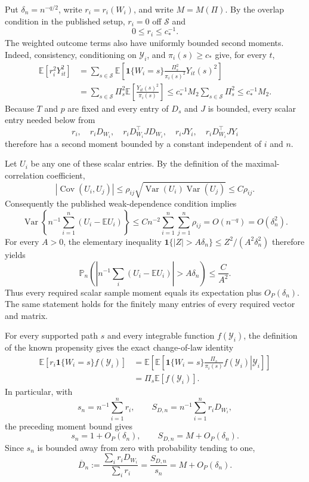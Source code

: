 Put \(\delta_n=n^{-q/2}\), write \(r_i=r_i(W_i)\), and write \(M=M(\Pi)\). By the overlap condition in the published setup, \(r_i=0\) off \(\mathcal S\) and
\[
0\leq r_i\leq c_*^{-1}.
\]
The weighted outcome terms also have uniformly bounded second moments. Indeed, consistency, conditioning on \(\mathscr Y_i\), and \(\pi_i(s)\geq c_*\) give, for every \(t\),
\[
\begin{aligned}
\mathbb E\!\left[r_i^2Y_{it}^2\right]
&=\sum_{s\in\mathcal S}\mathbb E\!\left[
  \mathbf 1\{W_i=s\}\frac{\Pi_s^2}{\pi_i(s)^2}Y_{it}(s)^2
\right]\\
&=\sum_{s\in\mathcal S}\Pi_s^2
  \mathbb E\!\left[\frac{Y_{it}(s)^2}{\pi_i(s)}\right]
\leq c_*^{-1}M_2\sum_{s\in\mathcal S}\Pi_s^2
\leq c_*^{-1}M_2.
\end{aligned}
\]
Because \(T\) and \(p\) are fixed and every entry of \(D_s\) and \(J\) is bounded, every scalar entry needed below from
\[
r_i,\quad r_iD_{W_i},\quad r_iD_{W_i}^{\top}JD_{W_i},
\quad r_iJY_i,\quad r_iD_{W_i}^{\top}JY_i
\]
therefore has a second moment bounded by a constant independent of \(i\) and \(n\).

Let \(U_i\) be any one of these scalar entries. By the definition of the maximal-correlation coefficient,
\[
\left|\operatorname{Cov}(U_i,U_j)\right|
\leq \rho_{ij}
\sqrt{\operatorname{Var}(U_i)\operatorname{Var}(U_j)}
\leq C\rho_{ij}.
\]
Consequently the published weak-dependence condition implies
\[
\operatorname{Var}\!\left\{n^{-1}\sum_{i=1}^{n}
(U_i-\mathbb E U_i)\right\}
\leq Cn^{-2}\sum_{i=1}^{n}\sum_{j=1}^{n}\rho_{ij}
=O(n^{-q})=O(\delta_n^2).
\]
For every \(A>0\), the elementary inequality
\(\mathbf 1\{|Z|>A\delta_n\}\leq Z^2/(A^2\delta_n^2)\)
therefore yields
\[
\mathbb P_n\!\left(
\left|n^{-1}\sum_i(U_i-\mathbb E U_i)\right|>A\delta_n
\right)\leq \frac{C}{A^2}.
\]
Thus every required scalar sample moment equals its expectation plus \(O_P(\delta_n)\). The same statement holds for the finitely many entries of every required vector and matrix.

For every supported path \(s\) and every integrable function \(f(\mathscr Y_i)\), the definition of the known propensity gives the exact change-of-law identity
\[
\begin{aligned}
\mathbb E\!\left[r_i\mathbf 1\{W_i=s\}f(\mathscr Y_i)\right]
&=\mathbb E\!\left[
  \mathbb E\!\left[
   \left.\mathbf 1\{W_i=s\}\frac{\Pi_s}{\pi_i(s)}f(\mathscr Y_i)
   \right|\mathscr Y_i\right]
\right]\\
&=\Pi_s\mathbb E[f(\mathscr Y_i)].
\end{aligned}
\]
In particular, with
\[
s_n=n^{-1}\sum_{i=1}^{n}r_i,
\qquad
S_{D,n}=n^{-1}\sum_{i=1}^{n}r_iD_{W_i},
\]
the preceding moment bound gives
\[
s_n=1+O_P(\delta_n),
\qquad
S_{D,n}=M+O_P(\delta_n).
\]
Since \(s_n\) is bounded away from zero with probability tending to one,
\[
\overline D_n:=\frac{\sum_i r_iD_{W_i}}{\sum_i r_i}
=\frac{S_{D,n}}{s_n}=M+O_P(\delta_n).
\]

